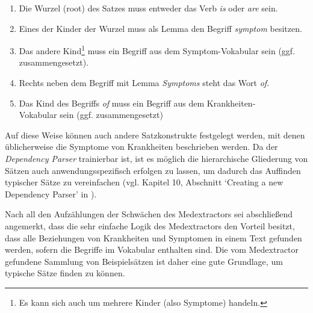 \begin{enumerate}
	\item Die Wurzel (root) des Satzes muss entweder das Verb \emph{is} oder \emph{are} sein.
	\item Eines der Kinder der Wurzel muss als Lemma den Begriff \emph{symptom} besitzen.
	\item Das andere Kind\footnote{Es kann sich auch um mehrere Kinder (also Symptome) handeln.} muss ein Begriff aus dem Symptom-Vokabular sein (ggf. zusammengesetzt).
	\item Rechts neben dem Begriff mit Lemma \emph{Symptoms} steht das Wort \emph{of}.
	\item Das Kind des Begriffs \emph{of} muss ein Begriff aus dem Krankheiten-\\Vokabular sein (ggf. zusammengesetzt)
\end{enumerate}

Auf diese Weise können auch andere Satzkonstrukte festgelegt werden, mit denen üblicherweise die Symptome von Krankheiten beschrieben werden. Da der \emph{Dependency Parser} trainierbar ist, ist es möglich die hierarchische Gliederung von Sätzen auch anwendungsspezifisch erfolgen zu lassen, um dadurch das Auffinden typischer Sätze zu vereinfachen (vgl. Kapitel 10, Abschnitt `Creating a new Dependency Parser' in \cite{vasiliev2020natural}).

Nach all den Aufzählungen der Schwächen des Medextractors sei abschließend angemerkt, dass die sehr einfache Logik des Medextractors den Vorteil besitzt, dass alle Beziehungen von Krankheiten und Symptomen in einem Text gefunden werden, sofern die Begriffe im Vokabular enthalten sind. Die vom Medextractor gefundene Sammlung von Beispielsätzen ist daher eine gute Grundlage, um typische Sätze finden zu können.

